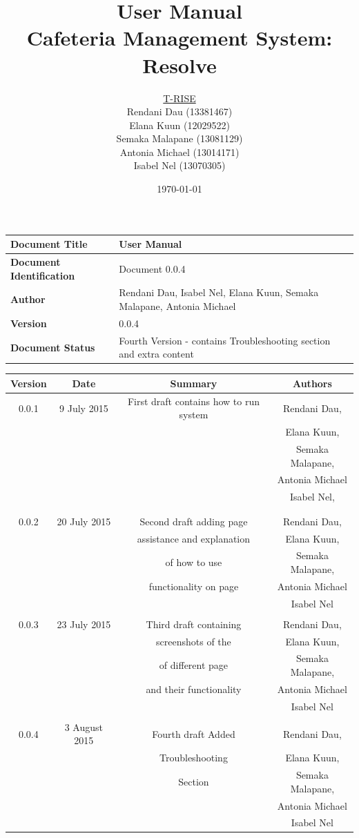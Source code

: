 \documentclass[a4paper,12pt]{article}
\title{\Huge User Manual \\ 
	Cafeteria Management System: Resolve}
\author{
         \underline{T-RISE}\\
          Rendani Dau (13381467) \\
	Elana Kuun (12029522) \\
	Semaka Malapane (13081129) \\
	Antonia Michael (13014171) \\
	Isabel Nel (13070305)}
\date{\today}
\begin{document}
\maketitle
\break

\tableofcontents
\break


 \begin{tabu} to 0.8\textwidth { | X[l] | X[l] | }
 \hline
 \textbf{Document Title} & User Manual \\
 \hline
 \textbf{Document Identification}  & Document 0.0.4  \\
 \hline
 \textbf{Author}  & Rendani Dau, Isabel Nel, Elana Kuun, Semaka Malapane, Antonia Michael \\
 \hline
 \textbf{Version} & 0.0.4 \\
 \hline
 \textbf{Document Status} & Fourth Version - contains Troubleshooting section and extra content\\
 \hline
 \end{tabu}

\begin{table}[h!]
\centering
 \begin{tabular}{||c c c c||} 
 \hline
 \textbf{Version} & \textbf{Date} & \textbf{Summary} & \textbf{Authors} \\ [0.5ex] 
 \hline\hline
 0.0.1 & 9 July 2015 &  First draft contains how to run system  & Rendani Dau, \\ & & & Elana Kuun, \\ & & & Semaka Malapane, \\ & & & Antonia Michael \\ & & & Isabel Nel, \\ & & & \\
 \hline 
 & & & \\
 0.0.2 & 20 July 2015 &  Second draft adding page  & Rendani Dau, \\ & & assistance and explanation & Elana Kuun, \\ & & of how to use & Semaka Malapane, \\ & & functionality on page &  Antonia Michael \\ & & & Isabel Nel \\   [1ex]  
 \hline 
 & & & \\
 0.0.3& 23 July 2015 &  Third draft containing  & Rendani Dau, \\ & & screenshots of the & Elana Kuun, \\ & & of different page & Semaka Malapane, \\ & & and their functionality &  Antonia Michael \\ & & & Isabel Nel \\   [1ex]  
 \hline
 & & & \\
 0.0.4& 3 August 2015 &  Fourth draft Added  & Rendani Dau, \\ & & Troubleshooting & Elana Kuun, \\ & & Section & Semaka Malapane, \\ & &  &  Antonia Michael \\ & & & Isabel Nel \\   [1ex]  
 \hline
 \end{tabular}
\end{table}
\end{document}
